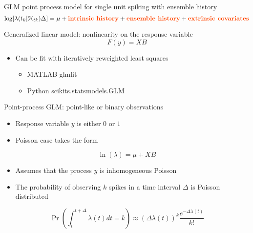 \documentclass[svgnames,13pt,handout]{beamer}
\DeclareRobustCommand{\emph}[1]{\textbf{{\color{emphasizecolor} #1}}}
\begin{document}
\begin{frame}{GLM point process model for single unit spiking with ensemble history}
\[\log[\lambda(t_k|\mathcal{H}_{tk})\Delta] = \mu + \text{\emph{intrinsic history}}
+ \text{\emph{ensemble history}}
+ \text{\emph{extrinsic covariates}}\]
\end{frame} 

\begin{frame}{Generalized linear model: nonlinearity on the response variable}
\[F(y) = XB\]
\begin{itemize}
	\item Can be fit with iteratively reweighted least squares 
	\begin{itemize}
		\item MATLAB glmfit \href{http://www.mathworks.com/help/stats/glmfit.html}{}
		\item Python scikits.statsmodels.GLM \href{http://statsmodels.sourceforge.net/stable/glm.html}{} 
	\end{itemize}
\end{itemize}
\end{frame} 

\begin{frame}{Point-process GLM: point-like or binary observations}
\begin{itemize}
	\item Response variable $y$ is either $0$ or $1$
	\item Poisson case takes the form
	\end{itemize}
\[\ln(\lambda) = \mu + XB\]
\begin{itemize}
	\item Assumes that the process $y$ is inhomogeneous Poisson
	\item The probability of observing $k$ spikes in a time interval $\Delta$ is Poisson distributed
	\end{itemize}
\[\Pr\left(\int_t^{t+\Delta}\lambda(t)dt = k\right) \approx (\Delta \lambda(t))^k \frac{ e^{-\Delta \lambda(t)}}{k!}\]
\end{frame} 
\end{document}
